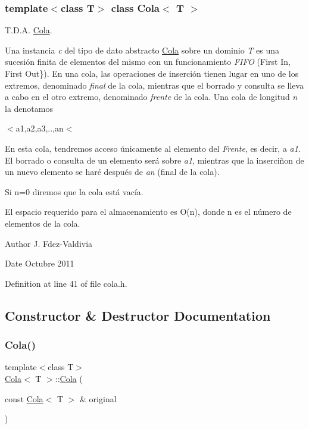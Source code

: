 \subsubsection*{template$<$class T$>$\newline
class Cola$<$ T $>$}

T.\+D.\+A. \hyperlink{classCola}{Cola}. 

Una instancia {\itshape c} del tipo de dato abstracto \hyperlink{classCola}{Cola} sobre un dominio {\itshape T} es una sucesión finita de elementos del mismo con un funcionamiento {\itshape F\+I\+FO} (First In, First Out\}). En una cola, las operaciones de inserción tienen lugar en uno de los extremos, denominado {\itshape final} de la cola, mientras que el borrado y consulta se lleva a cabo en el otro extremo, denominado {\itshape frente} de la cola. Una cola de longitud {\itshape n} la denotamos


\begin{DoxyItemize}
\item $<$a1,a2,a3,..,an$<$
\end{DoxyItemize}

En esta cola, tendremos acceso únicamente al elemento del {\itshape Frente}, es decir, a {\itshape a1}. El borrado o consulta de un elemento será sobre {\itshape a1}, mientras que la inserciñon de un nuevo elemento se haré después de {\itshape an} (final de la cola).

Si n=0 diremos que la cola está vacía.

El espacio requerido para el almacenamiento es O(n), donde n es el número de elementos de la cola.

\begin{DoxyAuthor}{Author}
J. Fdez-\/\+Valdivia 
\end{DoxyAuthor}
\begin{DoxyDate}{Date}
Octubre 2011 
\end{DoxyDate}


Definition at line 41 of file cola.\+h.



\subsection{Constructor \& Destructor Documentation}
\mbox{\label{classCola_a2249ab5603a92fddb8bd9bb55abeaa24}} 
\subsubsection{\texorpdfstring{Cola()}{Cola()}}
{\footnotesize\ttfamily template$<$class T$>$ \\
\hyperlink{classCola}{Cola}$<$ T $>$\+::\hyperlink{classCola}{Cola} (\begin{DoxyParamCaption}\item[{const \hyperlink{classCola}{Cola}$<$ T $>$ \&}]{original }\end{DoxyParamCaption})}



